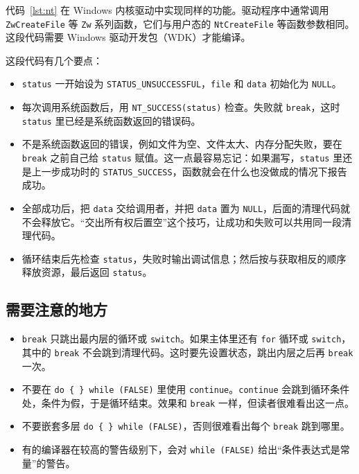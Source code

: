 代码~\ref{lst:nt} 在 Windows 内核驱动中实现同样的功能。驱动程序中通常调用 \texttt{ZwCreateFile} 等 \texttt{Zw} 系列函数，它们与用户态的 \texttt{NtCreateFile} 等函数参数相同。这段代码需要 Windows 驱动开发包（WDK）才能编译。


这段代码有几个要点：
\begin{itemize}
  \item \texttt{status} 一开始设为 \texttt{STATUS\_UNSUCCESSFUL}，\texttt{file} 和 \texttt{data} 初始化为 \texttt{NULL}。
  \item 每次调用系统函数后，用 \texttt{NT\_SUCCESS(status)} 检查。失败就 \texttt{break}，这时 \texttt{status} 里已经是系统函数返回的错误码。
  \item 不是系统函数返回的错误，例如文件为空、文件太大、内存分配失败，要在 \texttt{break} 之前自己给 \texttt{status} 赋值。这一点最容易忘记：如果漏写，\texttt{status} 里还是上一步成功时的 \texttt{STATUS\_SUCCESS}，函数就会在什么也没做成的情况下报告成功。
  \item 全部成功后，把 \texttt{data} 交给调用者，并把 \texttt{data} 置为 \texttt{NULL}，后面的清理代码就不会释放它。“交出所有权后置空”这个技巧，让成功和失败可以共用同一段清理代码。
  \item 循环结束后先检查 \texttt{status}，失败时输出调试信息；然后按与获取相反的顺序释放资源，最后返回 \texttt{status}。
\end{itemize}

\subsection{需要注意的地方}

\begin{itemize}
  \item \texttt{break} 只跳出最内层的循环或 \texttt{switch}。如果主体里还有 \texttt{for} 循环或 \texttt{switch}，其中的 \texttt{break} 不会跳到清理代码。这时要先设置状态，跳出内层之后再 \texttt{break} 一次。
  \item 不要在 \texttt{do \{ \} while (FALSE)} 里使用 \texttt{continue}。\texttt{continue} 会跳到循环条件处，条件为假，于是循环结束。效果和 \texttt{break} 一样，但读者很难看出这一点。
  \item 不要嵌套多层 \texttt{do \{ \} while (FALSE)}，否则很难看出每个 \texttt{break} 跳到哪里。
  \item 有的编译器在较高的警告级别下，会对 \texttt{while (FALSE)} 给出“条件表达式是常量”的警告。
\end{itemize}

